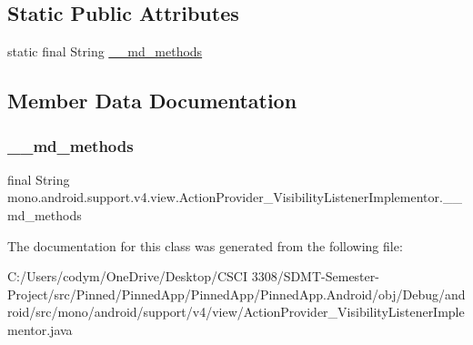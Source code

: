 \subsection*{Static Public Attributes}
\begin{DoxyCompactItemize}
\item 
static final String \hyperlink{classmono_1_1android_1_1support_1_1v4_1_1view_1_1_action_provider___visibility_listener_implementor_afe06803b18ae0e7f0a030aee26e1ad1d}{\+\_\+\+\_\+md\+\_\+methods}
\end{DoxyCompactItemize}


\subsection{Member Data Documentation}
\mbox{\label{classmono_1_1android_1_1support_1_1v4_1_1view_1_1_action_provider___visibility_listener_implementor_afe06803b18ae0e7f0a030aee26e1ad1d}} 
\subsubsection{\texorpdfstring{\+\_\+\+\_\+md\+\_\+methods}{\_\_md\_methods}}
{\footnotesize\ttfamily final String mono.\+android.\+support.\+v4.\+view.\+Action\+Provider\+\_\+\+Visibility\+Listener\+Implementor.\+\_\+\+\_\+md\+\_\+methods\hspace{0.3cm}{\ttfamily [static]}}



The documentation for this class was generated from the following file\+:\begin{DoxyCompactItemize}
\item 
C\+:/\+Users/codym/\+One\+Drive/\+Desktop/\+C\+S\+C\+I 3308/\+S\+D\+M\+T-\/\+Semester-\/\+Project/src/\+Pinned/\+Pinned\+App/\+Pinned\+App/\+Pinned\+App.\+Android/obj/\+Debug/android/src/mono/android/support/v4/view/Action\+Provider\+\_\+\+Visibility\+Listener\+Implementor.\+java\end{DoxyCompactItemize}
